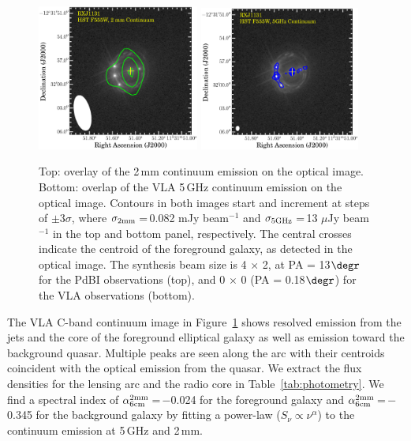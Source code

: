 \documentclass[]{emulateapj}
\newcommand{\pmOne}{\mbox{$^{-1}$}\xspace}
\newcommand{\Fig}[1]{Figure~\ref{fig:#1}}
\newcommand{\Tab}[1]{Table~\ref{tab:#1}}
\begin{document}
\begin{figure}[!htbp]
\includegraphics[trim=12 27 0 1, clip, width=0.475\textwidth]{f4a.eps}
\includegraphics[trim=10 5 0 0, clip, width=0.4695\textwidth]{f4b.eps}
\caption{Top: overlay of the 2\,mm continuum emission on the optical image.
Bottom: overlap of the VLA 5\,GHz continuum emission on the optical image.
Contours in both images start and increment at steps of
$\pm$3$\sigma$, where $\sigma_{\rm 2mm}$\,=\,0.082 mJy beam\pmOne and
$\sigma_{\rm 5GHz}$\,=\,13 $\mu$Jy beam\pmOne in the top and bottom panel, respectively.
The central crosses indicate the centroid of the foreground galaxy,
as detected in the optical image.
The synthesis beam size is 4 $\times$ 2, at PA = 13$\degr$ for
the PdBI observations (top), and
0 $\times$ 0 (PA = 0.18$\degr$) for
the VLA observations (bottom).
\label{fig:cont}}\vspace{0.51em}
\end{figure}

The VLA C-band continuum image in \Fig{cont} shows resolved emission from the
jets and the core of the foreground elliptical galaxy
as well as emission toward the background quasar.
Multiple peaks are seen along the arc with their centroids
coincident with the optical emission from the quasar.
We extract the flux densities for the lensing arc and the radio core in \Tab{photometry}.
We find a spectral index of $\alpha^{\rm 2mm}_{\rm 6cm}$\,=\,$-$0.024
for the foreground
galaxy and $\alpha^{\rm 2mm}_{\rm 6cm}$\,=\,$-$0.345
for the background galaxy by fitting a
power-law ($S_\nu \propto \nu^{\alpha}$) to the continuum emission at
5\,GHz and 2\,mm.
\end{document}
